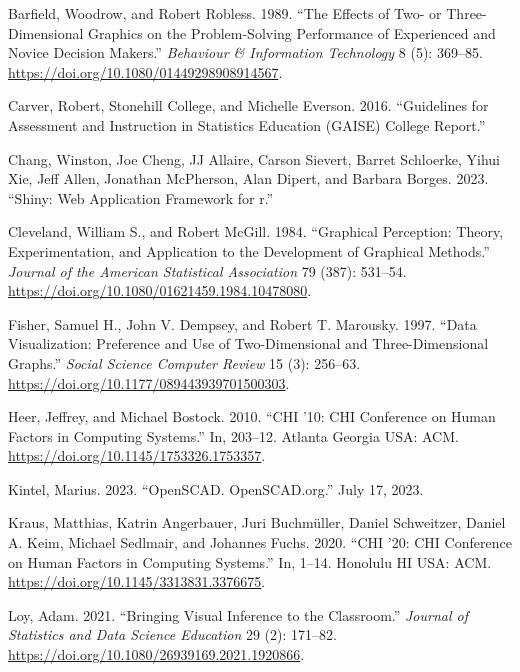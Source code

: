 \documentclass[
]{article}
\newlength{\cslhangindent}
\newenvironment{CSLReferences}[2] %
 {\begin{list}{}{%
  \setlength{\itemindent}{0pt}
  \setlength{\leftmargin}{0pt}
  \setlength{\parsep}{0pt}
  \ifodd #1
   \setlength{\leftmargin}{\cslhangindent}
   \setlength{\itemindent}{-1\cslhangindent}
  \fi
  \setlength{\itemsep}{#2\baselineskip}}}
 {\end{list}}
\begin{document}
\label{refs}
\begin{CSLReferences}{1}{0}
Barfield, Woodrow, and Robert Robless. 1989. {``The Effects of Two- or
Three-Dimensional Graphics on the Problem-Solving Performance of
Experienced and Novice Decision Makers.''} \emph{Behaviour \&
Information Technology} 8 (5): 369--85.
\url{https://doi.org/10.1080/01449298908914567}.

Carver, Robert, Stonehill College, and Michelle Everson. 2016.
{``Guidelines for Assessment and Instruction in Statistics Education
(GAISE) College Report.''}

Chang, Winston, Joe Cheng, JJ Allaire, Carson Sievert, Barret Schloerke,
Yihui Xie, Jeff Allen, Jonathan McPherson, Alan Dipert, and Barbara
Borges. 2023. {``Shiny: Web Application Framework for r.''}

Cleveland, William S., and Robert McGill. 1984. {``Graphical Perception:
Theory, Experimentation, and Application to the Development of Graphical
Methods.''} \emph{Journal of the American Statistical Association} 79
(387): 531--54. \url{https://doi.org/10.1080/01621459.1984.10478080}.

Fisher, Samuel H., John V. Dempsey, and Robert T. Marousky. 1997.
{``Data Visualization: Preference and Use of Two-Dimensional and
Three-Dimensional Graphs.''} \emph{Social Science Computer Review} 15
(3): 256--63. \url{https://doi.org/10.1177/089443939701500303}.

Heer, Jeffrey, and Michael Bostock. 2010. {``CHI '10: CHI Conference on
Human Factors in Computing Systems.''} In, 203--12. Atlanta Georgia USA:
ACM. \url{https://doi.org/10.1145/1753326.1753357}.

Kintel, Marius. 2023. {``{OpenSCAD}. {OpenSCAD}.org.''} July 17, 2023.

Kraus, Matthias, Katrin Angerbauer, Juri Buchmüller, Daniel Schweitzer,
Daniel A. Keim, Michael Sedlmair, and Johannes Fuchs. 2020. {``CHI '20:
CHI Conference on Human Factors in Computing Systems.''} In, 1--14.
Honolulu HI USA: ACM. \url{https://doi.org/10.1145/3313831.3376675}.

Loy, Adam. 2021. {``Bringing Visual Inference to the Classroom.''}
\emph{Journal of Statistics and Data Science Education} 29 (2): 171--82.
\url{https://doi.org/10.1080/26939169.2021.1920866}.


\end{CSLReferences}
\end{document}
